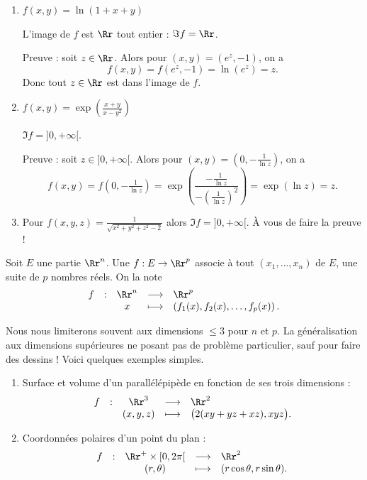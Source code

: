 \documentclass[12pt, class=report,crop=false]{standalone}
\begin{document}
\begin{exemple}
\sauteligne
\begin{enumerate}
  \item $f(x,y) = \ln(1 + x + y)$

  L'image de $f$ est $\Rr$ tout entier : $\Im f = \Rr$.
  
  Preuve : soit $z\in\Rr$. Alors pour $(x,y)=(e^z,-1)$, on a 
  $$f(x,y)= f(e^z,-1) = \ln(e^z)=z.$$ 
  Donc tout $z\in\Rr$ est dans l'image de $f$.
  
  \item $f(x,y) = \exp\left(\frac{x+y}{x-y^2}\right)$
 
  $\Im f = ]0,+\infty[$.
  
  Preuve : soit $z\in ]0,+\infty[$. 
  Alors pour $(x,y)=(0,-\tfrac{1}{\ln z})$, on a 
  $$f(x,y)= f(0,-\tfrac{1}{\ln z}) = \exp\left(\frac{-\tfrac{1}{\ln z}}{-(\tfrac{1}{\ln z})^2}\right)= \exp(\ln z) = z.$$ 
    
  \item Pour $f(x,y,z) = \frac {1}{\sqrt{x^2 + y^2 + z^2 - 2}}$
  alors $\Im f = ]0,+ \infty[$.
  À vous de faire la preuve !
 
  
\end{enumerate}
\end{exemple}


\begin{definition}
Soit $E$ une partie $\Rr^n$. 
Une  $f : E \to \Rr^p$ associe à tout 
$(x_1,\ldots,x_n)$ de $E$, une suite de $p$ nombres réels.
On la note 
$$\begin{array}{ccccl}f&:&\Rr^n&\longrightarrow &\Rr^p\\ &&x&\longmapsto &\left(f_1(x),f_2(x),\ldots ,f_p(x)\right).\end{array}$$
\end{definition}


Nous nous limiterons souvent aux dimensions $\le 3$ pour $n$ et $p$.
La généralisation aux dimensions supérieures ne posant pas de problème particulier, sauf pour faire des dessins ! Voici quelques exemples simples.

\begin{exemple}
\sauteligne
\begin{enumerate}
\item Surface et volume d'un parallélépipède en fonction de ses trois dimensions :
$$\begin{array}{ccccl}f&:&\Rr^3& \longrightarrow &\Rr^2\\ &&(x,y,z)&\longmapsto &\big(2(xy+yz+xz),xyz\big).\end{array}$$

\item Coordonnées polaires d'un point du plan :
$$\begin{array}{ccccl}f&:&\Rr^+\times [0,2\pi[&\longrightarrow &\Rr^2\\ &&(r,\theta)&\longmapsto &(r\cos \theta ,r\sin \theta ).\end{array}$$
\end{enumerate}
\end{exemple}
\end{document}
